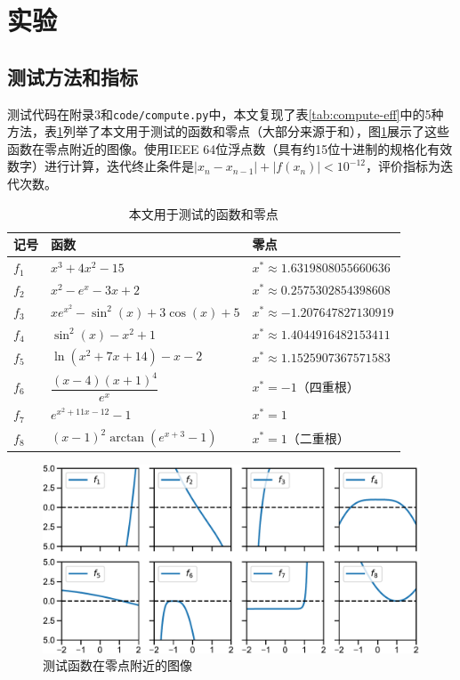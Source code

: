 
\section{实验}

\subsection{测试方法和指标}

测试代码在附录3和\texttt{code/compute.py}中，本文复现了表\ref{tab:compute-eff}中的5种方法，表\ref{tab:eval-func}列举了本文用于测试的函数和零点（大部分来源于\cite{kou2006modified}和\cite{chun2012new}），图\ref{fig:eval-func}展示了这些函数在零点附近的图像。使用IEEE 64位浮点数（具有约15位十进制的规格化有效数字）进行计算，迭代终止条件是$|x_{n} - x_{n-1}| + |f(x_n)| < 10^{-12}$，评价指标为迭代次数。



\begin{table}[!htbp]
    \centering
    \caption{本文用于测试的函数和零点}
    \label{tab:eval-func}
    \begin{tabular}{lll}
        \toprule
        记号 & 函数 & 零点\\
        \midrule
        $f_1$ & $x^3+4x^2-15$ & $x^*\approx 1.6319808055660636 $ \\
        $f_2$ & $x^2 - e^x - 3x + 2$ & $x^* \approx 0.2575302854398608$ \\
        $f_3$ & $xe^{x^2} - \sin^2(x) + 3\cos(x) + 5$ & $x^*\approx -1.207647827130919$ \\
        $f_4$ & $\sin^2(x) - x^2 + 1$ & $x^*\approx 1.4044916482153411 $ \\
        $f_5$ & $\ln(x^2 + 7x+ 14) - x - 2$ & $x^* \approx 1.1525907367571583$ \\
        $f_6$ & $\dfrac{(x - 4)(x + 1)^4}{e^x}$ & $x^*=-1$（四重根） \\
        $f_7$ & $e^{x^{2} + 11 x - 12} - 1$ & $x^*= 1$ \\
        $f_8$ & $(x - 1)^2\arctan(e^{x + 3} - 1)$ & $x^*= 1$（二重根） \\
        \bottomrule
    \end{tabular}    
\end{table}


\begin{figure}[!htbp]
    \centering
    \includegraphics[width=.9\linewidth]{figure/eval-func.pdf}
    \caption{测试函数在零点附近的图像}
    \label{fig:eval-func}
\end{figure}


